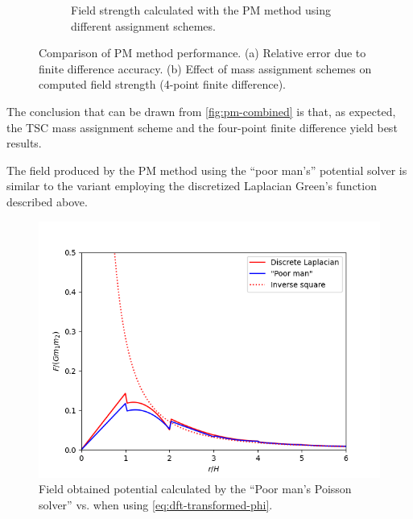 \begin{figure}[htp]
\begin{subfigure}[t]{0.48\textwidth}
        \caption{Field strength calculated with the PM method using different assignment schemes.}
        \label{fig:pm-mass-assignment-field-strength}
    \end{subfigure}
    \caption{Comparison of PM method performance. (a) Relative error due to finite difference accuracy. (b) Effect of mass assignment schemes on computed field strength (4-point finite difference).}
    \label{fig:pm-combined}
\end{figure}
The conclusion that can be drawn from \autoref{fig:pm-combined} is that, as expected, the TSC mass assignment scheme and the four-point finite difference yield best results.

The field produced by the PM method using the ``poor man's'' potential solver is similar to the variant employing the discretized Laplacian Green's function described above.
\begin{figure}[htp]
    \centering
    \includegraphics[scale=0.55]{img/poor-man-vs-laplacian.png}
    \caption{Field obtained potential calculated by the ``Poor man's Poisson solver'' vs. when using \autoref{eq:dft-transformed-phi}.}
    \label{fig:pm-poor-man-vs-laplacian}
\end{figure}

